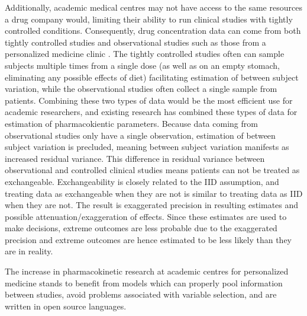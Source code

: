 Additionally, academic medical centres may not have access to the same resources a drug company would, limiting their ability to run clinical studies with tightly controlled conditions.  Consequently, drug concentration data can come from both tightly controlled studies \cite{tirona2018apixaban} and observational studies such as those from a personalized medicine clinic \cite{sukumar2019apixaban, gulilat2020drug}. The tightly controlled studies often can sample subjects multiple times from a single dose (as well as on an empty stomach, eliminating any possible effects of diet) facilitating estimation of between subject variation, while the observational studies often collect a single sample from patients. Combining these two types of data would be the most efficient use for academic researchers, and existing research \cite{cirincione2018population} has combined these types of data for estimation of pharmacokientic parameters.  Because data coming from observational studies only have a single observation, estimation of between subject variation is precluded, meaning between subject variation manifests as increased residual variance.  This difference in residual variance between observational and controlled clinical studies means patients can not be treated as exchangeable. Exchangeability is closely related to the IID assumption, and treating data as exchangeable when they are not is similar to treating data as IID when they are not.  The result is exaggerated precision in resulting estimates and possible attenuation/exaggeration of effects.  Since these estimates are used to make decisions, extreme outcomes are less probable due to the exaggerated precision and extreme outcomes are hence estimated to be less likely than they are in reality.

The increase in pharmacokinetic research at academic centres for personalized medicine stands to benefit from models which can properly pool information between studies, avoid problems associated with variable selection, and are written in open source languages.